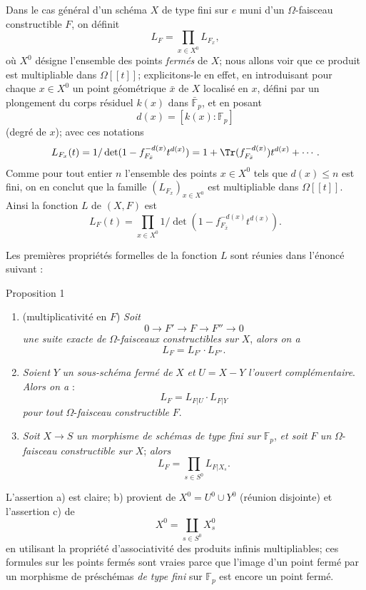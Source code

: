 Dans le cas
général d'un schéma $X$ de type fini sur $e$ muni d'un $\Omega$-faisceau constructible $F$, on définit
\[
L_F=\prod_{x\in X^0}L_{F_x},
\]
où $X^0$ désigne l'ensemble des points \emph{fermés} de $X$; nous allons voir que ce produit est multipliable dans $\Omega[[t]]$; explicitons-le en effet, en introduisant pour chaque $x\in X^0$ un point géométrique $\bar x$ de $X$ localisé en $x$, défini par un plongement du corps résiduel $k(x)$ dans $\bar{\mathbb{F}}_p$, et en posant
\[
d(x)=[k(x):\mathbb{F}_p]
\]
(degré de $x$); avec ces notations
\[
L_{F_x}(t)=1/\det(1-f_{F_{\bar x}}^{-d(x)}t^{d(x)})
 =1+\Tr(f_{F_{\bar x}}^{-d(x)})t^{d(x)}+\cdots .
\]
Comme pour tout entier $n$ l'ensemble des points $x\in X^0$ tels que $d(x)\le n$ est fini, on en conclut que la famille $(L_{F_x})_{x\in X^0}$ est multipliable dans $\Omega[[t]]$. Ainsi la fonction $L$ de $(X,F)$ est
\[
L_F(t)=\prod_{x\in X^0}1/\det(1-f_{F_{\bar x}}^{-d(x)}t^{d(x)}).
\]

Les premières propriétés formelles de la fonction $L$ sont réunies dans l'énoncé suivant :

\begin{statement}{Proposition 1}
\begin{enumerate}[label=\alph*)]
\item (multiplicativité en $F$) \emph{Soit}
\[
0\longrightarrow F'\longrightarrow F\longrightarrow F''\longrightarrow0
\]
\emph{une
suite exacte de} $\Omega$-\emph{faisceaux constructibles sur} $X$, \emph{alors on a}
\[
L_F=L_{F'}\cdot L_{F''}.
\]
\item \emph{Soient} $Y$ \emph{un sous-schéma fermé de} $X$ \emph{et} $U=X-Y$ \emph{l'ouvert complémentaire}. \emph{Alors on a} :
\[
L_F=L_{F|U}\cdot L_{F|Y}
\]
\emph{pour tout} $\Omega$-\emph{faisceau constructible} $F$.
\item \emph{Soit} $X\to S$ \emph{un morphisme de schémas de type fini sur} $\mathbb{F}_p$, \emph{et soit} $F$ \emph{un} $\Omega$-\emph{faisceau constructible sur} $X$; \emph{alors}
\[
L_F=\prod_{s\in S^0}L_{F|X_s}.
\]
\end{enumerate}
\end{statement}

L'assertion a) est claire; b) provient de $X^0=U^0\cup Y^0$ (réunion disjointe) et l'assertion c) de
\[
X^0=\coprod_{s\in S^0}X_s^0
\]
en utilisant la propriété d'associativité des produits infinis multipliables; ces formules sur les points fermés sont vraies parce que l'image d'un point fermé par un morphisme de préschémas \emph{de type fini} sur $\mathbb{F}_p$ est encore un point fermé.

